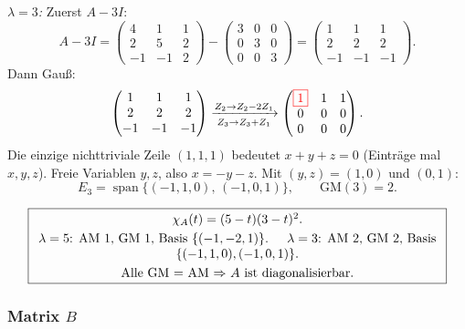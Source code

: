 \documentclass[a4paper,12pt]{article}
\newcommand{\piv}[1]{{\color{red}\boxed{#1}}}
\begin{document}
\textit{$\lambda = 3$:} Zuerst $A - 3I$:
\[
A - 3I = \begin{pmatrix} 4 & 1 & 1 \\ 2 & 5 & 2 \\ -1 & -1 & 2 \end{pmatrix} - \begin{pmatrix} 3 & 0 & 0 \\ 0 & 3 & 0 \\ 0 & 0 & 3 \end{pmatrix} = \begin{pmatrix} 1 & 1 & 1 \\ 2 & 2 & 2 \\ -1 & -1 & -1 \end{pmatrix}.
\]
Dann Gau\ss:
\[
\begin{pmatrix} 1 & 1 & 1 \\ 2 & 2 & 2 \\ -1 & -1 & -1 \end{pmatrix}
\xrightarrow[Z_3 \to Z_3 + Z_1]{Z_2 \to Z_2 - 2Z_1}
\begin{pmatrix} \piv{1} & 1 & 1 \\ 0 & 0 & 0 \\ 0 & 0 & 0 \end{pmatrix}.
\]
Die einzige nichttriviale Zeile $(1,1,1)$ bedeutet $x + y + z = 0$ (Eintr\"age mal $x, y, z$). Freie Variablen $y, z$, also $x = -y - z$. Mit $(y,z) = (1,0)$ und $(0,1)$:
\[
E_3 = \operatorname{span}\{(-1, 1, 0),\, (-1, 0, 1)\}, \qquad \text{GM}(3) = 2.
\]

\[
\fbox{\parbox{0.93\textwidth}{\centering
$\chi_A(t) = (5-t)(3-t)^2$. \\[3pt]
$\lambda = 5$: AM $1$, GM $1$, Basis $\{(-1,-2,1)\}$. \quad
$\lambda = 3$: AM $2$, GM $2$, Basis $\{(-1,1,0),(-1,0,1)\}$. \\[3pt]
Alle GM $=$ AM $\Rightarrow$ $A$ ist diagonalisierbar.
}}
\]

\subsubsection*{Matrix $B$}
\end{document}

